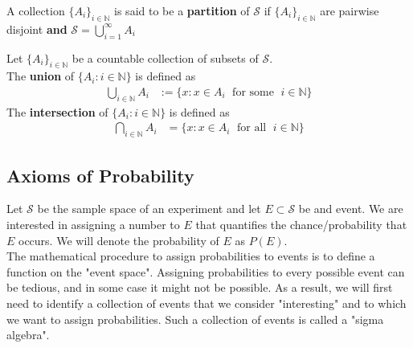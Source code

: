 \begin{defn}[Partition]
A collection $\{A_i\}_{i\in\mathbb{N}}$ is said to be a \textbf{partition} of $\mathcal{S}$ if $\{A_i\}_{i\in\mathbb{N}}$ are pairwise disjoint \textbf{and} $\mathcal{S}=\bigcup_{i=1}^{\infty}A_i$
\end{defn}

\begin{defn}
Let $\{A_i\}_{i\in\mathbb{N}}$ be a countable collection of subsets of $\mathcal{S}$.
\\
The \textbf{union} of $\{A_i: i \in \mathbb{N}\}$ is defined as \begin{align*}
\bigcup_{i\in \mathbb{N}}A_i &:=\{x : x\in A_i \;\text{ for some }\; i  \in \mathbb{N}\}
\end{align*}
The \textbf{intersection} of $\{A_i: i \in \mathbb{N}\}$  is defined as \begin{align*}
\bigcap_{i\in \mathbb{N}}A_i&=\{x : x\in A_i\; \text{ for all }\; i \in \mathbb{N}\}
\end{align*}
\end{defn}


\subsection[Axioms of Probability]{Axioms of Probability}
Let $\mathcal{S}$ be the sample space of an experiment and let $E\subset \mathcal{S}$ be and event. We are interested in assigning a number to $E$ that quantifies the chance/probability that $E$ occurs. We will denote the probability of $E$ as $P(E)$.
\\
The mathematical procedure to assign probabilities to events is to define a function on the "event space". Assigning probabilities to every possible event can be tedious, and in some case it might not be possible. As a result, we will first need to identify a collection of events that we consider "interesting" and to which we want to assign probabilities. Such a collection of events is called a "sigma algebra". 

